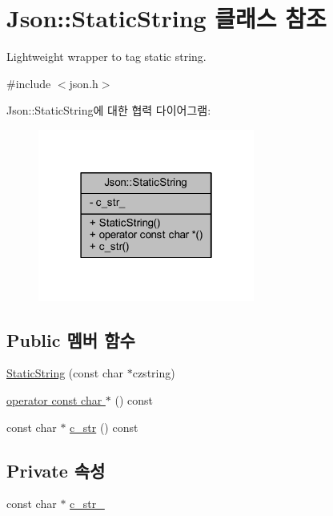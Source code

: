 \hypertarget{class_json_1_1_static_string}{}\section{Json\+:\+:Static\+String 클래스 참조}
\label{class_json_1_1_static_string}


Lightweight wrapper to tag static string.  




{\ttfamily \#include $<$json.\+h$>$}



Json\+:\+:Static\+String에 대한 협력 다이어그램\+:\nopagebreak
\begin{figure}[H]
\begin{center}
\leavevmode
\includegraphics[width=202pt]{class_json_1_1_static_string__coll__graph}
\end{center}
\end{figure}
\subsection*{Public 멤버 함수}
\begin{DoxyCompactItemize}
\item 
\hyperlink{class_json_1_1_static_string_afb6baf1ec078ce76f0b0f9b39d19437f}{Static\+String} (const char $\ast$czstring)
\item 
\hyperlink{class_json_1_1_static_string_a256a6cc0c630aef670848a0f11707b62}{operator const char $\ast$} () const
\item 
const char $\ast$ \hyperlink{class_json_1_1_static_string_ad6be703d432d108623bb0aa06b0b90ca}{c\+\_\+str} () const
\end{DoxyCompactItemize}
\subsection*{Private 속성}
\begin{DoxyCompactItemize}
\item 
const char $\ast$ \hyperlink{class_json_1_1_static_string_a9f0d9e8caee8f8db14e2c8c24760dffd}{c\+\_\+str\+\_\+}
\end{DoxyCompactItemize}


